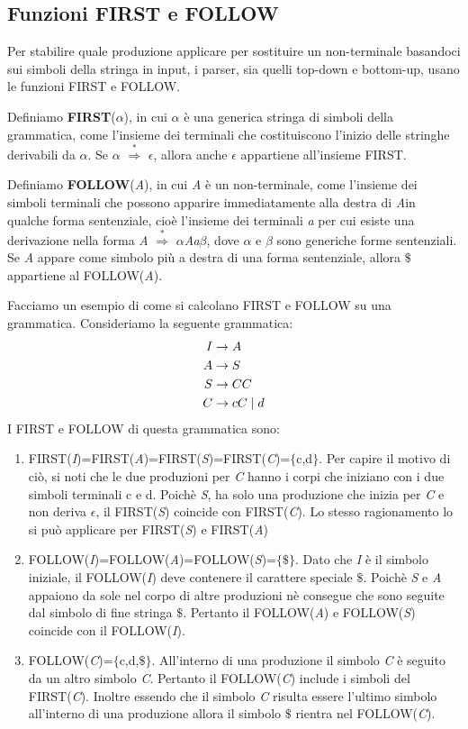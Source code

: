 \subsection{Funzioni FIRST e FOLLOW}
Per stabilire quale produzione applicare per sostituire un non-terminale basandoci sui simboli della stringa in input, i parser, sia quelli top-down e bottom-up, usano le funzioni FIRST e FOLLOW.\par
Definiamo \textbf{FIRST}($\alpha$), \cite{libro: compilatori} in cui $\alpha$ è una generica stringa di simboli della grammatica, come l'insieme dei terminali che costituiscono l'inizio delle stringhe derivabili da $\alpha$. Se $\alpha$ $\overset{*}{\Rightarrow}$ $\epsilon$, allora anche $\epsilon$ appartiene all'insieme FIRST.\par
Definiamo \textbf{FOLLOW}(\textit{A}), in cui \textit{A} è un non-terminale, come l'insieme dei simboli terminali che possono apparire immediatamente alla destra di \textit{A}in qualche forma sentenziale, cioè l'insieme dei terminali \textit{a} per cui esiste una derivazione nella forma \textit{A} $\overset{*}{\Rightarrow}$ $\alpha$\textit{Aa}$\beta$, dove $\alpha$ e $\beta$ sono generiche forme sentenziali. Se \textit{A} appare come simbolo più a destra di una forma sentenziale, allora $\$$ appartiene al FOLLOW(\textit{A}).\par 
\noindent Facciamo un esempio di come si calcolano FIRST e FOLLOW su una grammatica. Consideriamo la seguente grammatica:
\begin{align}\label{grammatica2}
	I  & \to A \notag \\
	A  & \to S \notag \\ 
	S  & \to CC \notag \\
	C  & \to cC \mid d 
\end{align}
I FIRST e FOLLOW di questa grammatica sono:
\begin{enumerate}
	\item FIRST(\textit{I})=FIRST(\textit{A})=FIRST(\textit{S})=FIRST(\textit{C})=$\{$c,d$\}$. Per capire il motivo di ciò, si noti che le due produzioni per \textit{C} hanno i corpi che iniziano con i due simboli terminali c e d. Poichè \textit{S}, ha solo una produzione che inizia per \textit{C} e non deriva $\epsilon$, il FIRST(\textit{S}) coincide con FIRST(\textit{C}). Lo stesso ragionamento lo si può applicare per FIRST(\textit{S}) e FIRST(\textit{A})
	\item FOLLOW(\textit{I})=FOLLOW(\textit{A})=FOLLOW(\textit{S})=$\{$$\$$$\}$. Dato che \textit{I} è il simbolo iniziale, il FOLLOW(\textit{I}) deve contenere il carattere speciale $\$$. Poichè \textit{S} e \textit{A} appaiono da sole nel corpo di altre produzioni nè consegue che sono seguite dal simbolo di fine stringa $\$$. Pertanto il  FOLLOW(\textit{A}) e  FOLLOW(\textit{S}) coincide con il  FOLLOW(\textit{I}).
	\item FOLLOW(\textit{C})=$\{$c,d,$\$$$\}$. All'interno di una produzione il simbolo \textit{C} è seguito da un altro simbolo \textit{C}. Pertanto il FOLLOW(\textit{C}) include i simboli del FIRST(\textit{C}). Inoltre essendo che il simbolo \textit{C} risulta essere l'ultimo simbolo all'interno di una produzione allora il simbolo $\$$ rientra nel FOLLOW(\textit{C}).
\end{enumerate}
